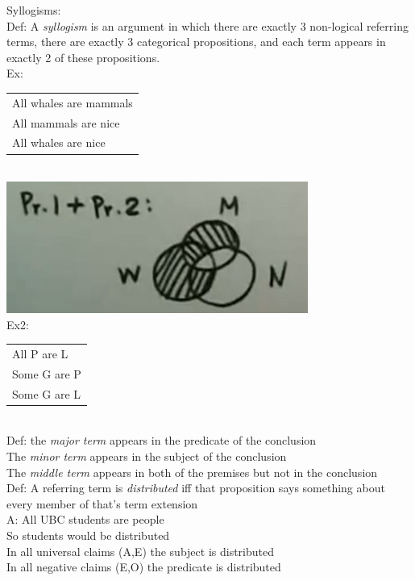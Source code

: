 \documentclass[11pt, fleqn]{article}
\newcommand{\argument}[2]{\begin{tabular}{p{#1 cm}} #2 \end{tabular}}
\begin{document}
Syllogisms:\\
Def: A \textit{syllogism} is an argument in which there are exactly 3 non-logical referring terms, there are exactly 3 categorical propositions, and each term appears in exactly 2 of these propositions.\\
Ex:\\
\argument{6}{All whales are mammals\\
All mammals are nice\\
\hline All whales are nice}\\
\includegraphics[scale=0.7]{Phil120Pictures/image4.png}\\

Ex2:\\
\argument{5}{All P are L\\Some G are P\\\hline Some G are L}\\
Def: the \textit{major term} appears in the predicate of the conclusion\\
The \textit{minor term} appears in the subject of the conclusion\\
The \textit{middle term} appears in both of the premises but not in the conclusion\\

Def: A referring term is \textit{distributed} iff that proposition says something about every member of that's term extension\\
A: All UBC students are people\\
So students would be distributed\\

In all universal claims (A,E) the subject is distributed\\
In all negative claims (E,O) the predicate is distributed\\
\end{document}
